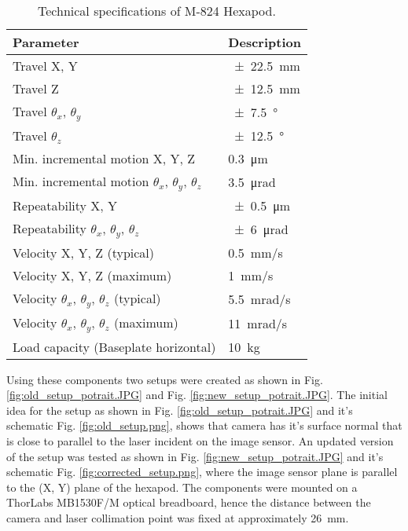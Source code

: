 \begin{table}[h]
    \centering
    \footnotesize
    \renewcommand{\arraystretch}{1.2}
    \begin{tabular}{p{7cm}p{3cm}}
        \toprule
        \textbf{Parameter} & \textbf{Description} \\
        \midrule
        Travel X, Y & \SI{\pm22.5}{\milli\meter} \\        
        Travel Z & \SI{\pm12.5}{\milli\meter} \\        
        Travel $\theta_x$, $\theta_y$ & \SI{\pm7.5}{\degree} \\        
        Travel $\theta_z$ & \SI{\pm12.5}{\degree} \\        
        Min. incremental motion X, Y, Z & \SI{0.3}{\micro\meter} \\
        Min. incremental motion $\theta_x$, $\theta_y$, $\theta_z$ & \SI{3.5}{\micro\radian} \\
        Repeatability X, Y & \SI{\pm0.5}{\micro\meter} \\
        Repeatability $\theta_x$, $\theta_y$, $\theta_z$ & \SI{\pm6}{\micro\radian} \\
        Velocity X, Y, Z (typical) & \SI{0.5}{\milli\meter/\second} \\
        Velocity X, Y, Z (maximum) & \SI{1}{\milli\meter/\second} \\
        Velocity $\theta_x$, $\theta_y$, $\theta_z$ (typical) & \SI{5.5}{\milli\radian/\second} \\
        Velocity $\theta_x$, $\theta_y$, $\theta_z$ (maximum) & \SI{11}{\milli\radian/\second} \\
        Load capacity (Baseplate horizontal) & \SI{10}{\kilo\gram} \\
        \bottomrule
    \end{tabular}
    \caption{Technical specifications of M-824 Hexapod. \cite{hexapod_manual}}
    \label{table:technical_specifications_hexapod}
\end{table}

\vspace{5mm}

\noindent Using these components two setups were created as shown in Fig. \ref{fig:old_setup_potrait.JPG} and Fig. \ref{fig:new_setup_potrait.JPG}. The initial idea for the setup as shown in Fig. \ref{fig:old_setup_potrait.JPG} and it's schematic Fig. \ref{fig:old_setup.png}, shows that camera has it's surface normal that is close to parallel to the laser incident on the image sensor. An updated version of the setup was tested as shown in Fig. \ref{fig:new_setup_potrait.JPG} and it's schematic Fig. \ref{fig:corrected_setup.png}, where the image sensor plane is parallel to the (X, Y) plane of the hexapod. The components were mounted on a ThorLabs MB1530F/M optical breadboard, hence the distance between the camera and laser collimation point was fixed at approximately \SI{26}{\milli\meter}.  

